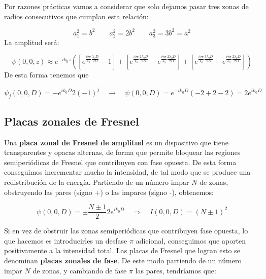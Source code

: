 \documentclass[12pt,a4paper]{book}
\numberwithin{equation}{section}
\numberwithin{figure}{section}
\newcommand{\parentesis}[1]{\left( #1  \right)}
\newcommand{\ccorchetes}[1]{\left[ #1  \right]}
\newcommand{\1}{_{(1)}}
\newcommand{\2}{_{(2)}}
\theoremstyle{definition}
\begin{document}
Por razones prácticas vamos a considerar que solo dejamos pasar tres zonas de radios consecutivos que cumplan esta relación:

\begin{equation}
    a_1^2 = b^2 \quad \quad a_2^2=2b^2 \quad \quad a_3^2 = 3b^2 = a^2
\end{equation}
La amplitud será:

\begin{equation}
    \psi (0,0,z) \approx e^{-ik_0z} \parentesis{\ccorchetes{e^{\frac{i2\pi}{\lambda_0}\frac{\lambda_0 D}{2D}}-1} + \ccorchetes{e^{\frac{i2\pi}{\lambda_0}\frac{2\lambda_0 D}{2D}}-e^{\frac{i2\pi}{\lambda_0}\frac{2\lambda_0 D}{2D}}} + \ccorchetes{e^{\frac{i2\pi}{\lambda_0}\frac{3\lambda_0 D}{2D}}-e^{\frac{i2\pi}{\lambda_0}\frac{2\lambda_0 D}{2D}}}}
\end{equation}
De esta forma tenemos que

\begin{equation}
    \psi_j (0,0,D) = - e^{ik_0D} 2 (-1)^j \quad \rightarrow \quad \psi (0,0,D) = e^{-ik_0D}(-2+2-2)=2e^{ik_0D}
\end{equation}

\subsection{Placas zonales de Fresnel}

Una \textbf{placa zonal de Fresnel de amplitud} es un dispositivo que tiene transparentes y opacas alternas, de forma que permite bloquear las regiones semiperiódicas de Fresnel que contribuyen con fase opuesta. De esta forma conseguimos incrementar mucho la intensidad, de tal modo que se produce una redistribución de la energía. Partiendo de un número impar $N$ de zonas, obstruyendo las pares (signo +) o las impares (signo -), obtenemos:

\begin{equation}
    \psi (0,0,D) = \pm \frac{N\pm1}{2} 2e^{ik_0 D} \quad \Rightarrow \quad I(0,0,D) = (N\pm1)^2
\end{equation}

Si en vez de obstruir las zonas semiperiódicas que contribuyen fase opuesta, lo que hacemos es introducirles un desfase $\pi$ adicional, conseguimos que aporten positivamente a la intensidad total. Las placas de Fresnel que logran esto se denominan \textbf{placas zonales de fase}. De este modo partiendo de un número impar $N$ de zonas, y cambiando de fase $\pi$ las pares, tendríamos que:
\end{document}
